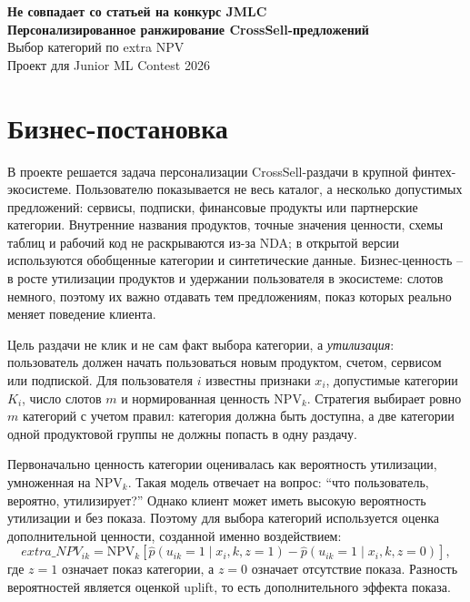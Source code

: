 \documentclass[11pt,a4paper]{article}
\newcommand{\NPV}{\mathrm{NPV}}
\begin{document}
\linespread{0.965}\selectfont
\raggedbottom

\begin{center}
{\bfseries Не совпадает со статьей на конкурс JMLC}\\[1.0mm]
{\Large\bfseries Персонализированное ранжирование CrossSell-предложений}\\[1.2mm]
{\large Выбор категорий по extra NPV}\\[1.8mm]
Проект для Junior ML Contest 2026
\end{center}

\section{Бизнес-постановка}

В проекте решается задача персонализации CrossSell-раздачи в крупной финтех-экосистеме. Пользователю показывается не весь каталог, а несколько допустимых предложений: сервисы, подписки, финансовые продукты или партнерские категории. Внутренние названия продуктов, точные значения ценности, схемы таблиц и рабочий код не раскрываются из-за NDA; в открытой версии используются обобщенные категории и синтетические данные. Бизнес-ценность -- в росте утилизации продуктов и удержании пользователя в экосистеме: слотов немного, поэтому их важно отдавать тем предложениям, показ которых реально меняет поведение клиента.

Цель раздачи не клик и не сам факт выбора категории, а \textit{утилизация}: пользователь должен начать пользоваться новым продуктом, счетом, сервисом или подпиской. Для пользователя $i$ известны признаки $x_i$, допустимые категории $K_i$, число слотов $m$ и нормированная ценность $\NPV_k$. Стратегия выбирает ровно $m$ категорий с учетом правил: категория должна быть доступна, а две категории одной продуктовой группы не должны попасть в одну раздачу.

Первоначально ценность категории оценивалась как вероятность утилизации, умноженная на $\NPV_k$. Такая модель отвечает на вопрос: ``что пользователь, вероятно, утилизирует?'' Однако клиент может иметь высокую вероятность утилизации и без показа. Поэтому для выбора категорий используется оценка дополнительной ценности, созданной именно воздействием:
\[
extra\_NPV_{ik}=
\NPV_k\left[
\hat p(u_{ik}=1\mid x_i,k,z=1)-
\hat p(u_{ik}=1\mid x_i,k,z=0)
\right],
\]
где $z=1$ означает показ категории, а $z=0$ означает отсутствие показа. Разность вероятностей является оценкой uplift, то есть дополнительного эффекта показа.
\end{document}
